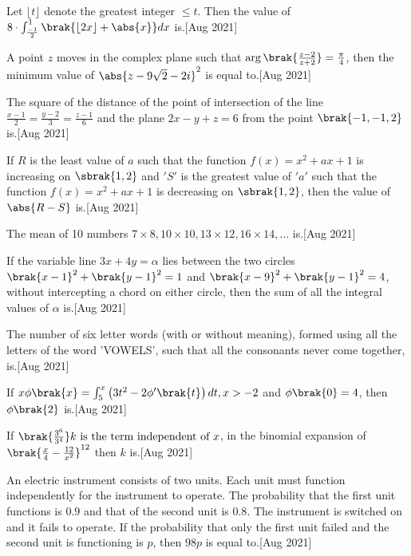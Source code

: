 \iffalse
\title{2021}
\author{ee24btech11009}
\section{integer}
\fi
\item Let $\lfloor t\rfloor$ denote the greatest integer $\leq t$. Then the value of $8 \cdot \int_{\frac{-1}{2}}^{1} \brak{\lfloor 2x\rfloor + \abs{x}} dx $
is.\hfill{[Aug 2021]}
\item A point $z$ moves in the complex plane such that 
$\arg\brak{\frac{z - 2}{z + 2}} = \frac{\pi}{4}$, then the minimum value of $\abs{z - 9\sqrt{2} - 2i}^2$ is equal to.\hfill{[Aug 2021]}
\item  The square of the distance of the point of intersection of the line 
$\frac{x - 1}{2} = \frac{y - 2}{3} = \frac{z - 1}{6}$
and the plane $2x - y + z = 6$ from the point $\brak{-1, -1, 2}$ is.\hfill{[Aug 2021]}
\item If $R$ is the least value of $a$ such that the function $f(x) = x^2 + ax + 1$ is increasing on $\sbrak{1, 2}$ and $'S'$ is the greatest value of $'a'$ such that the function $f(x) = x^2 + ax + 1$ is decreasing on $\sbrak{1, 2}$, then the value of $\abs{R - S}$ is.\hfill{[Aug 2021]}
\item The mean of 10 numbers $7 \times 8, 10 \times 10, 13 \times 12, 16 \times 14, \dots$ is.\hfill{[Aug 2021]}
\item  If the variable line $3x + 4y = \alpha$ lies between the two circles $\brak{x - 1}^2 + \brak{y - 1}^2 = 1$ and $\brak{x - 9}^2 + \brak{y - 1}^2 = 4$, without intercepting a chord on either circle, then the sum of all the integral values of $\alpha$ is.\hfill{[Aug 2021]}
\item The number of six letter words (with or without meaning), formed using all the letters of the word 'VOWELS', such that all the consonants never come together, is.\hfill{[Aug 2021]}
\item If $x\phi\brak{x} =\int_{5}^{x}\left(3t^2 - 2\phi^\prime\brak{t}\right) dt, x > -2$
and $\phi\brak{0} = 4$, then $\phi\brak{2}$ is.\hfill{[Aug 2021]}
\item If $\brak{\frac{3^6}{3^4}}k \text{ is the term independent of } x$, in the binomial expansion of $\brak{\frac{x}{4} - \frac{12}{x^2}}^{12}
$ then $k$ is.\hfill{[Aug 2021]}
\item An electric instrument consists of two units. Each unit must function independently for the instrument to operate. The probability that the first unit functions is $0.9$ and that of the second unit is $0.8$. The instrument is switched on and it fails to operate. If the probability that only the first unit failed and the second unit is functioning is $p$, then $98p$ is equal to.\hfill{[Aug 2021]}
